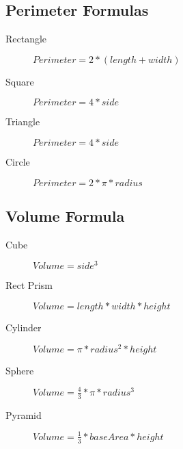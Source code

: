 \documentclass[10pt, a4paper]{article}
\begin{document}
\begin{multicols}{2}
\subsection{Perimeter Formulas}
\begin{description}
    \item[Rectangle] 
        \begin{math}
            Perimeter = 2 *(length + width)
        \end{math}
    \item[Square] 
        \begin{math}
            Perimeter = 4 * side
        \end{math}
    \item[Triangle] 
        \begin{math}
            Perimeter = 4 * side
        \end{math}
    \item[Circle] 
        \begin{math}
            Perimeter = 2 * \pi * radius
        \end{math}
        
\end{description}

\subsection{Volume Formula}
\begin{description}
    \item[Cube] 
        \begin{math}
            Volume = side ^ 3
        \end{math}
    \item[Rect Prism] 
        \begin{math}
            Volume = length * width * height
        \end{math}
    \item[Cylinder] 
        \begin{math}
            Volume = \pi * radius ^2 *height
        \end{math}
    \item[Sphere] 
        \begin{math}
            Volume = \frac{4}{3}*\pi*radius^3
        \end{math}
    \item[Pyramid] 
        \begin{math}
            Volume = \frac{1}{3} *baseArea *height
        \end{math}
\end{description}


\end{multicols}
\end{document}
